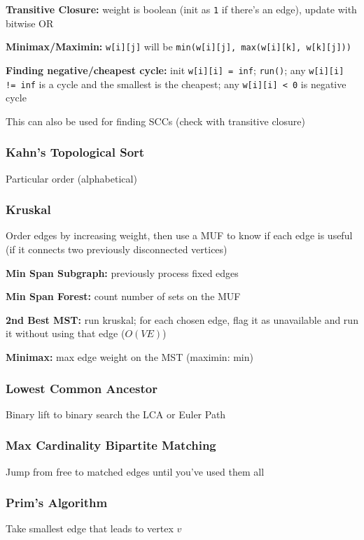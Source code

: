 \documentclass[12pt, a4paper, twoside]{article}
\begin{document}
\textbf{Transitive Closure:} weight is boolean (init as \texttt{1} if there's an edge), update with bitwise OR

\textbf{Minimax/Maximin:} \texttt{w[i][j]} will be \texttt{min(w[i][j], max(w[i][k], w[k][j]))}

\textbf{Finding negative/cheapest cycle:} init \texttt{w[i][i] = inf}; \texttt{run()}; any \texttt{w[i][i] != inf} is a cycle and the smallest is the cheapest; any \texttt{w[i][i] < 0} is negative cycle

This can also be used for finding SCCs (check with transitive closure)

\subsubsection{Kahn's Topological Sort}
Particular order (alphabetical)

\subsubsection{Kruskal}
Order edges by increasing weight, then use a MUF to know if each edge is useful (if it connects two previously disconnected vertices)

\textbf{Min Span Subgraph:} previously process fixed edges

\textbf{Min Span Forest:} count number of sets on the MUF

\textbf{2nd Best MST:} run kruskal; for each chosen edge, flag it as unavailable and run it without using that edge ($O(VE)$)

\textbf{Minimax:} max edge weight on the MST (maximin: min)

\subsubsection{Lowest Common Ancestor}
Binary lift to binary search the LCA or Euler Path

\subsubsection{Max Cardinality Bipartite Matching}
Jump from free to matched edges until you've used them all

\subsubsection{Prim's Algorithm}
Take smallest edge that leads to vertex $v$
\end{document}

